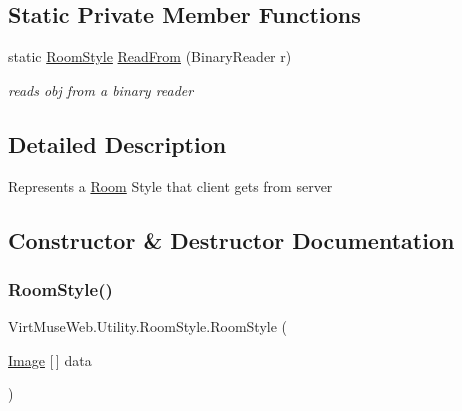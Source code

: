 \subsection*{Static Private Member Functions}
\begin{DoxyCompactItemize}
\item 
static \mbox{\hyperlink{class_virt_muse_web_1_1_utility_1_1_room_style}{Room\+Style}} \mbox{\hyperlink{class_virt_muse_web_1_1_utility_1_1_room_style_aa2db7310f1626d8c2c75434a4dd87e69}{Read\+From}} (Binary\+Reader r)
\begin{DoxyCompactList}\small\item\em reads obj from a binary reader \end{DoxyCompactList}\end{DoxyCompactItemize}


\subsection{Detailed Description}
Represents a \mbox{\hyperlink{class_room}{Room}} Style that client gets from server 



\subsection{Constructor \& Destructor Documentation}
\mbox{\label{class_virt_muse_web_1_1_utility_1_1_room_style_ae2bc5b82887f4acdd9d02432fb7561bd}} 
\subsubsection{\texorpdfstring{Room\+Style()}{RoomStyle()}\hspace{0.1cm}{\footnotesize\ttfamily [1/2]}}
{\footnotesize\ttfamily Virt\+Muse\+Web.\+Utility.\+Room\+Style.\+Room\+Style (\begin{DoxyParamCaption}\item[{\mbox{\hyperlink{class_virt_muse_web_1_1_utility_1_1_image}{Image}} \mbox{[}$\,$\mbox{]}}]{data }\end{DoxyParamCaption})}



